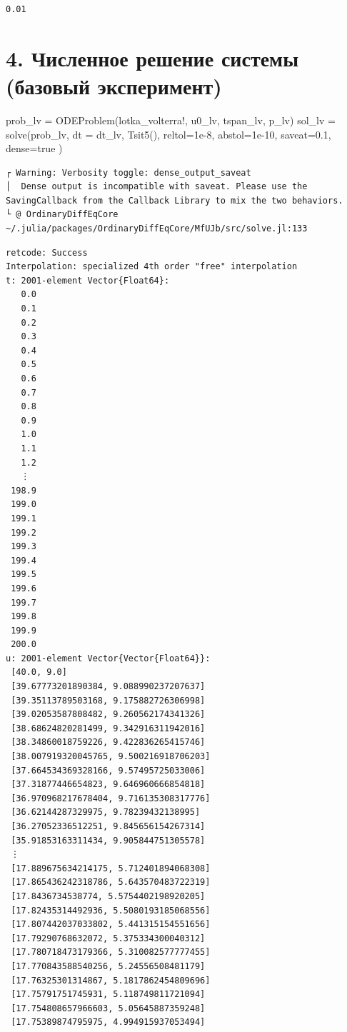 \documentclass[
  12pt,
  a4paper,
  DIV=11,
  numbers=noendperiod]{scrreprt}
\newenvironment{Shaded}{\begin{snugshade}}{\end{snugshade}}
\newcommand{\ConstantTok}[1]{\textcolor[rgb]{0.56,0.35,0.01}{#1}}
\newcommand{\FloatTok}[1]{\textcolor[rgb]{0.68,0.00,0.00}{#1}}
\newcommand{\FunctionTok}[1]{\textcolor[rgb]{0.28,0.35,0.67}{#1}}
\newcommand{\NormalTok}[1]{\textcolor[rgb]{0.00,0.23,0.31}{#1}}
\newcommand{\OperatorTok}[1]{\textcolor[rgb]{0.37,0.37,0.37}{#1}}
\begin{document}
\begin{verbatim}
0.01
\end{verbatim}

\section{4. Численное решение системы (базовый
эксперимент)}\label{ux447ux438ux441ux43bux435ux43dux43dux43eux435-ux440ux435ux448ux435ux43dux438ux435-ux441ux438ux441ux442ux435ux43cux44b-ux431ux430ux437ux43eux432ux44bux439-ux44dux43aux441ux43fux435ux440ux438ux43cux435ux43dux442}

\begin{Shaded}
\begin{Highlighting}[]
\NormalTok{prob\_lv }\OperatorTok{=} \FunctionTok{ODEProblem}\NormalTok{(lotka\_volterra!, u0\_lv, tspan\_lv, p\_lv)}
\NormalTok{sol\_lv }\OperatorTok{=} \FunctionTok{solve}\NormalTok{(prob\_lv,}
\NormalTok{    dt }\OperatorTok{=}\NormalTok{ dt\_lv,}
    \FunctionTok{Tsit5}\NormalTok{(),}
\NormalTok{    reltol}\OperatorTok{=}\FloatTok{1e{-}8}\NormalTok{,}
\NormalTok{    abstol}\OperatorTok{=}\FloatTok{1e{-}10}\NormalTok{,}
\NormalTok{    saveat}\OperatorTok{=}\FloatTok{0.1}\NormalTok{,}
\NormalTok{    dense}\OperatorTok{=}\ConstantTok{true}
\NormalTok{)}
\end{Highlighting}
\end{Shaded}

\begin{verbatim}
┌ Warning: Verbosity toggle: dense_output_saveat 
│  Dense output is incompatible with saveat. Please use the SavingCallback from the Callback Library to mix the two behaviors.
└ @ OrdinaryDiffEqCore ~/.julia/packages/OrdinaryDiffEqCore/MfUJb/src/solve.jl:133
\end{verbatim}

\begin{verbatim}
retcode: Success
Interpolation: specialized 4th order "free" interpolation
t: 2001-element Vector{Float64}:
   0.0
   0.1
   0.2
   0.3
   0.4
   0.5
   0.6
   0.7
   0.8
   0.9
   1.0
   1.1
   1.2
   ⋮
 198.9
 199.0
 199.1
 199.2
 199.3
 199.4
 199.5
 199.6
 199.7
 199.8
 199.9
 200.0
u: 2001-element Vector{Vector{Float64}}:
 [40.0, 9.0]
 [39.67773201890384, 9.088990237207637]
 [39.35113789503168, 9.175882726306998]
 [39.02053587808482, 9.260562174341326]
 [38.68624820281499, 9.342916311942016]
 [38.34860018759226, 9.422836265415746]
 [38.007919320045765, 9.500216918706203]
 [37.664534369328166, 9.57495725033006]
 [37.31877446654823, 9.646960666854818]
 [36.970968217678404, 9.716135308317776]
 [36.62144287329975, 9.78239432138995]
 [36.27052336512251, 9.845656154267314]
 [35.91853163311434, 9.905844751305578]
 ⋮
 [17.889675634214175, 5.712401894068308]
 [17.865436242318786, 5.643570483722319]
 [17.8436734538774, 5.5754402198920205]
 [17.82435314492936, 5.5080193185068556]
 [17.807442037033802, 5.441315154551656]
 [17.79290768632072, 5.375334300040312]
 [17.780718473179366, 5.310082577777455]
 [17.770843588540256, 5.24556508481179]
 [17.76325301314867, 5.1817862454809696]
 [17.75791751745931, 5.118749811721094]
 [17.754808657966603, 5.05645887359248]
 [17.75389874795975, 4.994915937053494]
\end{verbatim}
\end{document}
